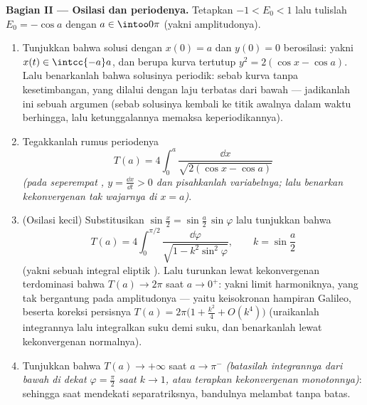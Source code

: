 \begin{problem}
\medskip
\noindent\textbf{Bagian II --- Osilasi dan periodenya.}
Tetapkan $-1 < E_0 < 1$ lalu tulislah $E_0 = -\cos a$ dengan $a \in
\intoo0\pi$ (yakni amplitudonya).
\begin{enumerate}[resume]
  \item Tunjukkan bahwa solusi dengan $x(0) = a$ dan $y(0) = 0$
        berosilasi: yakni $x(t) \in \intcc{-a}a$, dan  berupa
        kurva tertutup $y^2 = 2(\cos x - \cos a)$. Lalu benarkanlah
        bahwa solusinya periodik: sebab  kurva 
        tanpa kesetimbangan, yang dilalui dengan laju terbatas
        dari bawah --- jadikanlah ini sebuah argumen (sebab solusinya kembali
        ke titik awalnya dalam waktu berhingga, lalu ketunggalannya
        memaksa keperiodikannya).
  \item Tegakkanlah rumus periodenya
        \[
        T(a) = 4\int_0^{a}\frac{\dd x}{\sqrt{2(\cos x -
        \cos a)}}
        \]
        \emph{(pada seperempat , $y = \frac{\dd x}{\dd t} >
        0$ dan pisahkanlah variabelnya; lalu benarkan
        kekonvergenan tak wajarnya di $x = a$)}.
  \item (Osilasi kecil) Substitusikan $\sin\frac x2 =
        \sin\frac a2\,\sin\varphi$ lalu tunjukkan bahwa
        \[
        T(a) = 4\int_0^{\pi/2}\frac{\dd\varphi}{\sqrt{1 -
        k^2\sin^2\varphi}},
        \qquad k = \sin\frac a2
        \]
        (yakni sebuah integral eliptik ). Lalu turunkan lewat kekonvergenan
        terdominasi bahwa $T(a) \to 2\pi$ saat $a \to 0^+$: yakni
        limit harmoniknya, yang tak bergantung pada amplitudonya ---
        yaitu keisokronan hampiran Galileo, beserta koreksi persisnya $T(a) = 2\pi\bigl(1 + \frac{k^2}4 +
        O(k^4)\bigr)$ (uraikanlah integrannya lalu integralkan
        suku demi suku, dan benarkanlah lewat kekonvergenan normalnya).
  \item Tunjukkan bahwa $T(a) \to +\infty$ saat $a \to \pi^-$
        \emph{(batasilah integrannya dari bawah di dekat $\varphi =
        \frac\pi2$ saat $k \to 1$, atau terapkan kekonvergenan
        monotonnya)}: sehingga saat mendekati separatriksnya,
        bandulnya melambat tanpa batas.
\end{enumerate}


\end{problem}

